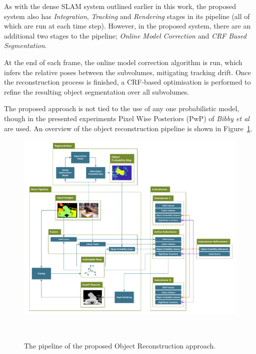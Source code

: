 As with the dense SLAM system outlined earlier in this work, the proposed system
also has \textit{Integration}, \textit{Tracking} and \textit{Rendering}
stages in its pipeline (all of which are run at each time step). However, in
the proposed system, there are an additional two stages to the pipeline;
\textit{Online Model Correction} and \textit{CRF Based Segmentation}.

At the end of each frame, the online model correction algorithm is run, which
infers the relative poses between the subvolumes, mitigating tracking drift.
Once the reconstruction process is finished, a CRF-based optimisation is 
performed to refine the resulting object segmentation over all subvolumes.

The proposed approach is not tied to the use of any one probabilistic model,
though in the presented experiments Pixel Wise Posteriors (PwP) of \textit{Bibby et al} 
~\cite{Bibby2008} are used. An overview of the object reconstruction pipeline is shown in
Figure~\ref{figure:probobj_pipeline_diagram}.

\begin{figure}[!htbp]
  \centering
  \includegraphics[width=\linewidth]{figures/object_recon/pipeline.pdf}
  \caption[Probabilistic Object Reconstruction Pipeline]
  {The pipeline of the proposed Object Reconstruction approach.}
~\label{figure:probobj_pipeline_diagram}
\end{figure}

